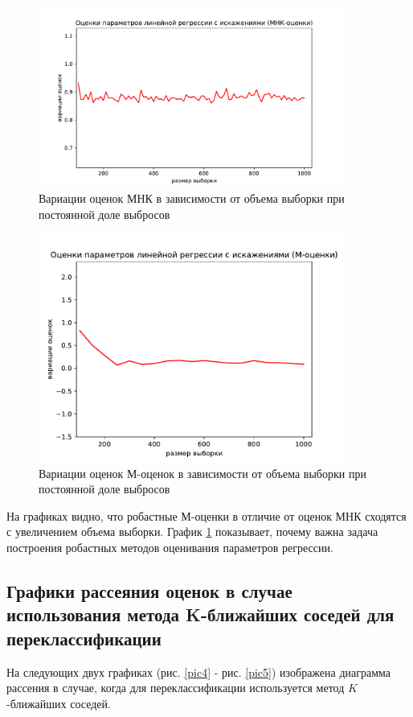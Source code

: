 \begin{figure}[h!]
    \centering
    \includegraphics[width=100mm]{../images/OLS.pdf}
    \caption{Вариации оценок МНК в зависимости от объема выборки при постоянной доле выбросов\label{overflow}}
    \label{pic_ols}
\end{figure}

\begin{figure}[h!]
    \centering
    \includegraphics[width=100mm]{../images/RLM.pdf}
    \caption{Вариации оценок М-оценок в зависимости от объема выборки при постоянной доле выбросов\label{overflow}}
\end{figure}

На графиках видно, что робастные М-оценки в отличие от оценок МНК сходятся с увеличением объема выборки. 
График \ref{pic_ols} показывает, почему важна задача построения робастных методов оценивания параметров регрессии.

\subsection{Графики рассеяния оценок в случае использования метода K-ближайших соседей для переклассификации}
На следующих двух графиках (рис. \ref{pic4} - рис. \ref{pic5}) изображена диаграмма рассения в случае, когда для переклассификации используется метод $K$-ближайших соседей.

